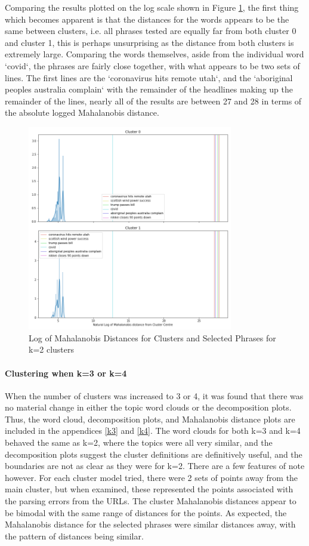 Comparing the results plotted on the log scale shown in Figure \ref{fig:wordsk2}, the first thing which becomes apparent is that the distances for the words appears to be the same between clusters, i.e. all phrases tested are equally far from both cluster 0 and cluster 1, this is perhaps unsurprising as the distance from both clusters is extremely large. Comparing the words themselves, aside from the individual word `covid`, the phrases are fairly close together, with what appears to be two sets of lines. The first lines are the `coronavirus hits remote utah`, and the `aboriginal peoples australia complain` with the remainder of the headlines making up the remainder of the lines, nearly all of the results are between 27 and 28 in terms of the absolute logged Mahalanobis distance. 
\begin{figure}[H]
	\centering
	\includegraphics[width=0.8\textwidth]{images/words_kmeans_mahalanobis_distance_k=2.png}
	\caption{Log of Mahalanobis Distances for Clusters and Selected Phrases for k=2 clusters}
	\label{fig:wordsk2}
\end{figure}

\paragraph{Clustering when k=3 or k=4} 
When the number of clusters was increased to 3 or 4, it was found that there was no material change in either the topic word clouds or the decomposition plots. Thus, the word cloud, decomposition plots, and Mahalanobis distance plots are included in the appendices \ref{k3} and \ref{k4}. The word clouds for both k=3 and k=4 behaved the same as k=2, where the topics were all very similar, and the decomposition plots suggest the cluster definitions are definitively useful, and the boundaries are not as clear as they were for k=2.  There are a few features of note however. For each cluster model tried, there were 2 sets of points away from the main cluster, but when examined, these represented the points associated with the parsing errors from the URLs. The cluster Mahalanobis distances appear to be bimodal with the same range of distances for the points. As expected, the Mahalanobis distance for the selected phrases were similar distances away, with the pattern of distances being similar.

